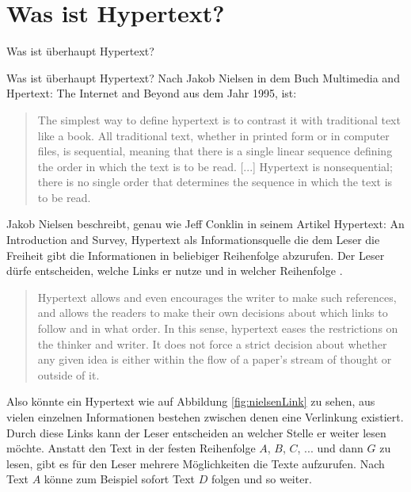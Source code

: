 \chapter{Was ist Hypertext?}
\label{ch:Was ist Hypertext?}

\begin{section}{Was ist überhaupt Hypertext?}
\label{sec:big_brother}

Was ist überhaupt Hypertext? Nach Jakob Nielsen in dem Buch Multimedia and Hpertext: The Internet and Beyond aus dem Jahr 1995, ist:

\begin{quote}
\glqq The simplest way to define hypertext is to contrast it with traditional text like a book. All traditional text, whether in printed form or in computer files, is sequential, meaning that there is a single linear sequence defining the order in which the text is to be read. [...] Hypertext is nonsequential; there is no single order that determines the sequence in which the text is to be read.\grqq{ }\cite[S.1]{Nielsen1995}
\end{quote}

Jakob Nielsen beschreibt, genau wie Jeff Conklin in seinem Artikel Hypertext: An Introduction and Survey, Hypertext als Informationsquelle die dem Leser die Freiheit gibt die Informationen in beliebiger Reihenfolge abzurufen. Der Leser dürfe entscheiden, welche Links er nutze und in welcher Reihenfolge \cite[S.33]{Conklin1987} \cite[S.1]{Nielsen1995}.

\begin{quote}
\glqq Hypertext allows and even encourages the writer to make such references, and allows the readers to make their own decisions about which links to follow and in what order. In this sense, hypertext eases the restrictions on the thinker and writer. It does not force a strict decision about whether any given idea is either within the flow of a paper's stream of thought or outside of it.\grqq{ }\cite[S.33]{Conklin1987}
\end{quote}

Also könnte ein Hypertext wie auf Abbildung \ref{fig:nielsenLink} zu sehen, aus vielen einzelnen Informationen bestehen zwischen denen eine Verlinkung existiert. Durch diese Links kann der Leser entscheiden an welcher Stelle er weiter lesen möchte. Anstatt den Text in der festen Reihenfolge $A$, $B$, $C$, $...$ und dann $G$ zu lesen, gibt es für den Leser mehrere Möglichkeiten die Texte aufzurufen. Nach Text $A$ könne zum Beispiel sofort Text $D$ folgen und so weiter\cite[S.1]{Nielsen1995}.


\end{section}
